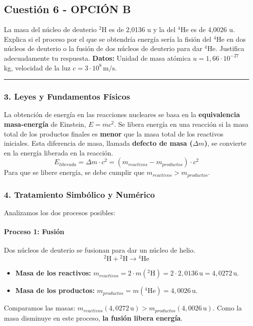 \newpage

\subsection{Cuestión 6 - OPCIÓN B}
\label{subsec:6B_2009_jun_ord}

\begin{cajaenunciado}
La masa del núcleo de deuterio ${}^{2}\text{H}$ es de 2,0136 u y la del ${}^{4}\text{He}$ es de 4,0026 u. Explica si el proceso por el que se obtendría energía sería la fisión del ${}^{4}\text{He}$ en dos núcleos de deuterio o la fusión de dos núcleos de deuterio para dar ${}^{4}\text{He}$. Justifica adecuadamente tu respuesta.
\textbf{Datos:} Unidad de masa atómica $u=1,66\cdot10^{-27}$ kg, velocidad de la luz $c=3\cdot10^{8}\,\text{m/s}$.
\end{cajaenunciado}
\hrule

\subsubsection*{3. Leyes y Fundamentos Físicos}
La obtención de energía en las reacciones nucleares se basa en la \textbf{equivalencia masa-energía} de Einstein, $E=mc^2$. Se libera energía en una reacción si la masa total de los productos finales es \textbf{menor} que la masa total de los reactivos iniciales. Esta diferencia de masa, llamada \textbf{defecto de masa ($\Delta m$)}, se convierte en la energía liberada en la reacción.
$$ E_{liberada} = \Delta m \cdot c^2 = (m_{reactivos} - m_{productos}) \cdot c^2 $$
Para que se libere energía, se debe cumplir que $m_{reactivos} > m_{productos}$.

\subsubsection*{4. Tratamiento Simbólico y Numérico}
Analizamos los dos procesos posibles:

\paragraph{Proceso 1: Fusión}
Dos núcleos de deuterio se fusionan para dar un núcleo de helio.
$$ {}^{2}\text{H} + {}^{2}\text{H} \longrightarrow {}^{4}\text{He} $$
\begin{itemize}
    \item \textbf{Masa de los reactivos:} $m_{reactivos} = 2 \cdot m({}^{2}\text{H}) = 2 \cdot 2,0136 \, \text{u} = 4,0272 \, \text{u}$.
    \item \textbf{Masa de los productos:} $m_{productos} = m({}^{4}\text{He}) = 4,0026 \, \text{u}$.
\end{itemize}
Comparamos las masas: $m_{reactivos} (4,0272 \, \text{u}) > m_{productos} (4,0026 \, \text{u})$.
Como la masa disminuye en este proceso, \textbf{la fusión libera energía}.


